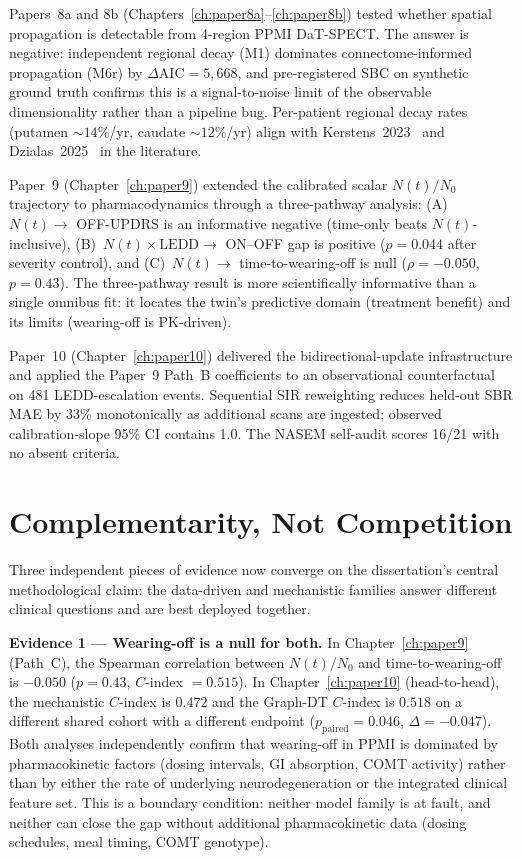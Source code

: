Papers~8a and 8b (Chapters~\ref{ch:paper8a}--\ref{ch:paper8b}) tested whether spatial propagation is detectable from 4-region PPMI DaT-SPECT. The answer is negative: independent regional decay (M1) dominates connectome-informed propagation (M6r) by $\Delta\mathrm{AIC} = 5{,}668$, and pre-registered SBC on synthetic ground truth confirms this is a signal-to-noise limit of the observable dimensionality rather than a pipeline bug. Per-patient regional decay rates (putamen $\sim 14\%$/yr, caudate $\sim 12\%$/yr) align with Kerstens~2023~\cite{kerstens2023} and Dzialas~2025~\cite{dzialas2025dat} in the literature.

Paper~9 (Chapter~\ref{ch:paper9}) extended the calibrated scalar $N(t)/N_0$ trajectory to pharmacodynamics through a three-pathway analysis: (A)~$N(t) \to$ OFF-UPDRS is an informative negative (time-only beats $N(t)$-inclusive), (B)~$N(t) \times \mathrm{LEDD} \to$ ON--OFF gap is positive ($p = 0.044$ after severity control), and (C)~$N(t) \to$ time-to-wearing-off is null ($\rho = -0.050$, $p = 0.43$). The three-pathway result is more scientifically informative than a single omnibus fit: it locates the twin's predictive domain (treatment benefit) and its limits (wearing-off is PK-driven).

Paper~10 (Chapter~\ref{ch:paper10}) delivered the bidirectional-update infrastructure and applied the Paper~9 Path~B coefficients to an observational counterfactual on 481 LEDD-escalation events. Sequential SIR reweighting reduces held-out SBR MAE by 33\% monotonically as additional scans are ingested; observed calibration-slope 95\% CI contains 1.0. The NASEM self-audit scores 16/21 with no absent criteria.

\section{Complementarity, Not Competition}
\label{sec:disc-complementarity}

Three independent pieces of evidence now converge on the dissertation's central methodological claim: the data-driven and mechanistic families answer different clinical questions and are best deployed together.

\textbf{Evidence 1 --- Wearing-off is a null for both.} In Chapter~\ref{ch:paper9} (Path~C), the Spearman correlation between $N(t)/N_0$ and time-to-wearing-off is $-0.050$ ($p = 0.43$, $C$-index $= 0.515$). In Chapter~\ref{ch:paper10} (head-to-head), the mechanistic $C$-index is $0.472$ and the Graph-DT $C$-index is $0.518$ on a different shared cohort with a different endpoint ($p_\text{paired} = 0.046$, $\Delta = -0.047$). Both analyses independently confirm that wearing-off in PPMI is dominated by pharmacokinetic factors (dosing intervals, GI absorption, COMT activity) rather than by either the rate of underlying neurodegeneration or the integrated clinical feature set. This is a boundary condition: neither model family is at fault, and neither can close the gap without additional pharmacokinetic data (dosing schedules, meal timing, COMT genotype).

